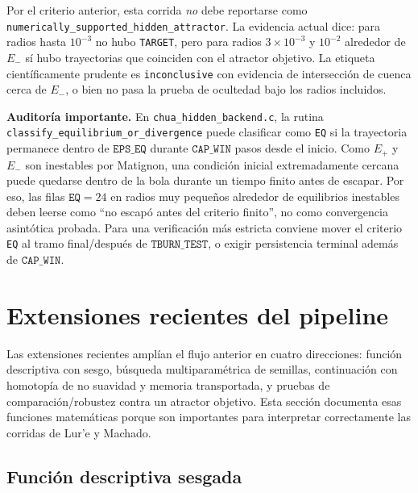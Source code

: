 \documentclass[11pt]{article}
\begin{document}
Por el criterio anterior, esta corrida \emph{no} debe reportarse como
\texttt{numerically\_supported\_hidden\_attractor}. La evidencia actual dice:
para radios hasta \(10^{-3}\) no hubo \texttt{TARGET}, pero para radios
\(3\times10^{-3}\) y \(10^{-2}\) alrededor de \(E_-\) sí hubo trayectorias que
coinciden con el atractor objetivo. La etiqueta científicamente prudente es
\texttt{inconclusive} con evidencia de intersección de cuenca cerca de
\(E_-\), o bien no pasa la prueba de ocultedad bajo los radios incluidos.

\textbf{Auditoría importante.} En \texttt{chua\_hidden\_backend.c}, la rutina
\texttt{classify\_equilibrium\_or\_divergence} puede clasificar como
\texttt{EQ} si la trayectoria permanece dentro de \(\texttt{EPS\_EQ}\) durante
\(\texttt{CAP\_WIN}\) pasos desde el inicio. Como \(E_+\) y \(E_-\) son
inestables por Matignon, una condición inicial extremadamente cercana puede
quedarse dentro de la bola durante un tiempo finito antes de escapar. Por
eso, las filas \(\texttt{EQ}=24\) en radios muy pequeños alrededor de
equilibrios inestables deben leerse como ``no escapó antes del criterio
finito'', no como convergencia asintótica probada. Para una verificación más
estricta conviene mover el criterio \texttt{EQ} al tramo final/después de
\(\texttt{TBURN\_TEST}\), o exigir persistencia terminal además de
\(\texttt{CAP\_WIN}\).

\section{Extensiones recientes del pipeline}
\label{sec:extensiones-recientes}

Las extensiones recientes amplían el flujo anterior en cuatro direcciones:
función descriptiva con sesgo, búsqueda multiparamétrica de semillas,
continuación con homotopía de no suavidad y memoria transportada, y pruebas de
comparación/robustez contra un atractor objetivo. Esta sección documenta esas
funciones matemáticas porque son importantes para interpretar correctamente
las corridas de Lur'e y Machado.

\subsection{Función descriptiva sesgada}
\end{document}
